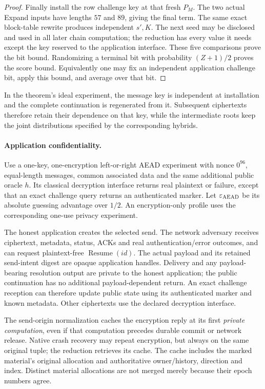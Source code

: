 \begin{proof}
Finally install the row challenge key at that fresh $P_M$. The two actual
Expand inputs have lengths $57$ and $89$, giving the final term.
The same exact block-table rewrite produces independent $s',K$.
The next seed may be disclosed and used in all later chain computation;
the reduction has every value it needs except the key reserved to the
application interface. These five comparisons prove the bit bound.
Randomizing a terminal bit with probability $(Z+1)/2$ proves the score
bound. Equivalently one may fix an independent application challenge bit,
apply this bound, and average over that bit.
\end{proof}

In the theorem's ideal experiment, the message key is independent at
installation and the complete continuation is regenerated from it.
Subsequent ciphertexts therefore retain their dependence on that key,
while the intermediate roots keep the joint distributions specified by
the corresponding hybrids.

\paragraph{Application confidentiality.}
Use a one-key, one-encryption left-or-right AEAD experiment with nonce
$0^{96}$, equal-length messages, common associated data and the same
additional public oracle $h$. Its classical decryption interface returns
real plaintext or failure, except that an exact challenge query returns
an authenticated marker. Let $\varepsilon_{\rm AEAD}$ be its absolute
guessing advantage over $1/2$. An encryption-only profile uses the
corresponding one-use privacy experiment.

The honest application creates the selected send. The network adversary
receives ciphertext, metadata, status, ACKs and real authentication/error
outcomes, and can request plaintext-free $\operatorname{Resume}(id)$.
The actual payload and its retained send-intent digest are opaque
application handles. Delivery and any payload-bearing resolution output
are private to the honest application; the public continuation has no
additional payload-dependent return. An exact challenge reception can
therefore update public state using its authenticated marker and known
metadata. Other ciphertexts use the declared decryption interface.

The send-origin normalization caches the encryption reply at its first
\emph{private computation}, even if that computation precedes durable
commit or network release. Native crash recovery may repeat encryption,
but always on the same original tuple; the reduction retrieves its cache.
The cache includes the marked material's original allocation and
authoritative owner/history, direction and index. Distinct material
allocations are not merged merely because their epoch numbers agree.

